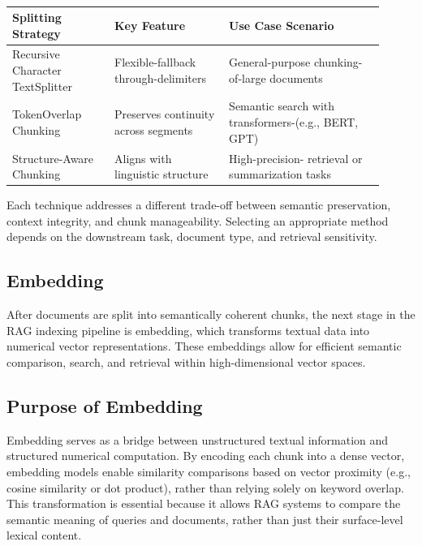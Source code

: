 \documentclass[twocolumn, 10pt]{article}
\begin{document}
\begin{table}[H]
\centering
\begin{tabular}{|p{0.25\linewidth}|p{0.28\linewidth}|p{0.38\linewidth}|}
\hline
\textbf{Splitting Strategy} & \textbf{Key Feature} & \textbf{Use Case Scenario} \\
\hline
Recursive Character TextSplitter & Flexible-fallback through-delimiters & General-purpose chunking-of-large documents \\
\hline
TokenOverlap Chunking & Preserves continuity across segments & Semantic search with transformers-(e.g., BERT, GPT) \\
\hline
Structure-Aware Chunking & Aligns with linguistic structure & High-precision- retrieval or summarization tasks \\
\hline
\end{tabular}
\caption{}
\label{tab:splitting-strategies}
\end{table}



Each technique addresses a different trade-off between semantic preservation, context integrity, and chunk manageability. Selecting an appropriate method depends on the downstream task, document type, and retrieval sensitivity.

\subsection{Embedding}

After documents are split into semantically coherent chunks, the next stage in the RAG indexing pipeline is embedding, which transforms textual data into numerical vector representations. These embeddings allow for efficient semantic comparison, search, and retrieval within high-dimensional vector spaces.

\subsection{Purpose of Embedding}

Embedding serves as a bridge between unstructured textual information and structured numerical computation. By encoding each chunk into a dense vector, embedding models enable similarity comparisons based on vector proximity (e.g., cosine similarity or dot product), rather than relying solely on keyword overlap. This transformation is essential because it allows RAG systems to compare the semantic meaning of queries and documents, rather than just their surface-level lexical content.
\end{document}
